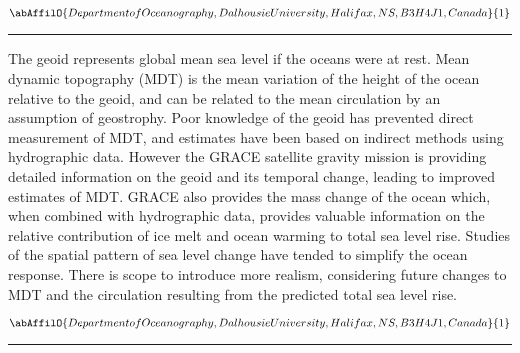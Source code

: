 \begin{center}
   \vspace{2 mm} \begin{center}
    \vspace{2 mm}\begin{center}
  
  $\abAffilO{Department of Oceanography, Dalhousie University, Halifax, NS, B3H 4J1, Canada}{1}$

  \end{center}
  \vspace{2 mm}
  \end{center}\end{center}
  \begin{center}\rule{0.70\linewidth}{0.5 pt}\end{center}

\noindent The geoid represents global mean sea level if the oceans were at rest. Mean dynamic topography (MDT) is the mean variation of the height of the ocean relative to the geoid, and can be related to the mean circulation by an assumption of geostrophy. Poor knowledge of the geoid has prevented direct measurement of MDT, and estimates have been based on indirect methods using hydrographic data. However the GRACE satellite gravity mission is providing detailed information on the geoid and its temporal change, leading to improved estimates of MDT. GRACE also provides the mass change of the ocean which, when combined with hydrographic data, provides valuable information on the relative contribution of ice melt and ocean warming to total sea level rise. Studies of the spatial pattern of sea level change have tended to simplify the ocean response. There is scope to introduce more realism, considering future changes to MDT and the circulation resulting from the predicted total sea level rise.

\begin{center}
   \vspace{2 mm} \begin{center}
    \vspace{2 mm}\begin{center}
  
  $\abAffilO{Department of Oceanography, Dalhousie University, Halifax, NS, B3H 4J1, Canada}{1}$

  \end{center}
  \vspace{2 mm}
  \end{center}\end{center}
  \begin{center}\rule{0.70\linewidth}{0.5 pt}\end{center}

